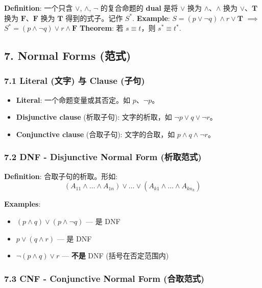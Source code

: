 \documentclass[10pt,a4paper,openany]{ctexbook}
\theoremstyle{definition}
\theoremstyle{remark}
\begin{document}
\textbf{Definition}: 一个只含 $\lor$, $\land$, $\neg$ 的复合命题的 \textbf{dual} 是将 $\lor$ 换为 $\land$、$\land$ 换为 $\lor$、$\mathbf{T}$ 换为 $\mathbf{F}$、$\mathbf{F}$ 换为 $\mathbf{T}$ 得到的式子。记作 $S^*$.
\textbf{Example}: $S = (p \lor \neg q) \land r \lor \mathbf{T}$ $\implies$ $S^* = (p \land \neg q) \lor r \land \mathbf{F}$
\textbf{Theorem}: 若 $s \equiv t$，则 $s^* \equiv t^*$.
\vspace{-2pt}

\subsection{7. Normal Forms (范式)}

\subsubsection{7.1 Literal (文字) 与 Clause (子句)}

\begin{itemize}
\item \textbf{Literal}: 一个命题变量或其否定。如 $p$、$\neg p$。
\item \textbf{Disjunctive clause} (析取子句): 文字的析取，如 $\neg p \lor q \lor \neg r$。
\item \textbf{Conjunctive clause} (合取子句): 文字的合取，如 $p \land q \land \neg r$。

\end{itemize}

\subsubsection{7.2 DNF - Disjunctive Normal Form (析取范式)}

\textbf{Definition}: 合取子句的析取。形如:
\[
(A_{11} \land \dots \land A_{1n}) \lor \dots \lor (A_{k1} \land \dots \land A_{kn_k})
\]

\textbf{Examples}:
\begin{itemize}
\item $(p \land q) \lor (p \land \neg q)$ — 是 DNF
\item $p \lor (q \land r)$ — 是 DNF
\item $\neg(p \land q) \lor r$ — \textbf{不是} DNF (括号在否定范围内)

\end{itemize}

\subsubsection{7.3 CNF - Conjunctive Normal Form (合取范式)}
\end{document}

